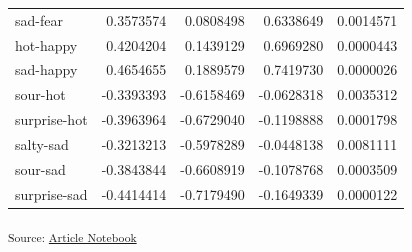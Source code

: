\documentclass[
  letterpaper,
  DIV=11,
  numbers=noendperiod]{scrartcl}
\begin{document}
\begin{longtable}[]{@{}lrrrr@{}}
sad-fear & 0.3573574 & 0.0808498 & 0.6338649 & 0.0014571 \\
hot-happy & 0.4204204 & 0.1439129 & 0.6969280 & 0.0000443 \\
sad-happy & 0.4654655 & 0.1889579 & 0.7419730 & 0.0000026 \\
sour-hot & -0.3393393 & -0.6158469 & -0.0628318 & 0.0035312 \\
surprise-hot & -0.3963964 & -0.6729040 & -0.1198888 & 0.0001798 \\
salty-sad & -0.3213213 & -0.5978289 & -0.0448138 & 0.0081111 \\
sour-sad & -0.3843844 & -0.6608919 & -0.1078768 & 0.0003509 \\
surprise-sad & -0.4414414 & -0.7179490 & -0.1649339 & 0.0000122 \\
\end{longtable}

\textsubscript{Source:
\href{https://matteospanio.github.io/multimodal-symphony-survey-analysis/index.qmd.html}{Article
Notebook}}
\end{document}
